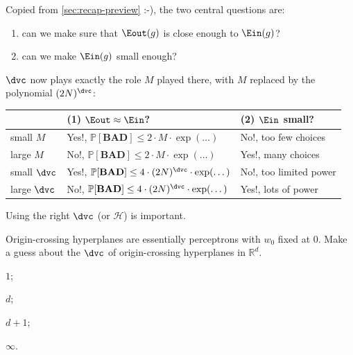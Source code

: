 Copied from \autoref{sec:recap-preview} :-), the two central questions are:

\begin{enumerate}[(1)]
    \item can we make sure that \(\Eout(g)\) is close enough to \(\Ein(g)\)?
    \item can we make \(\Ein(g)\) small enough?
\end{enumerate}

\(\dvc\) now plays exactly the role \(M\) played there, with \(M\) replaced by
the polynomial \((2N)^{\dvc}\):

\begin{center}
    \solidrules
    \begin{tabular}{@{}l|l|l@{}}
        \toprule
        & (1) \(\Eout \approx \Ein\)? & (2) \(\Ein\) small?\\
        \midrule
        small \(M\) & Yes!, \(\mathbb{P}[\textbf{BAD}] \le 2 \cdot M \cdot
        \exp(\dots)\) & No!, too few choices\\
        large \(M\) & No!, \(\mathbb{P}[\textbf{BAD}] \le 2 \cdot M \cdot
        \exp(\dots)\) & Yes!, many choices\\
        \midrule
        small \(\dvc\) & Yes!, \(\mathbb{P}[\textbf{BAD}] \le 4 \cdot
        (2N)^{\dvc} \cdot \exp(\dots)\) & No!, too limited power\\
        large \(\dvc\) & No!, \(\mathbb{P}[\textbf{BAD}] \le 4 \cdot
        (2N)^{\dvc} \cdot \exp(\dots)\) & Yes!, lots of power\\
        \bottomrule
    \end{tabular}
\end{center}

\begin{moral}
    Using the right \(\dvc\) (or \(\mathcal{H}\)) is important.
\end{moral}

\begin{exercise}
    Origin-crossing hyperplanes are essentially perceptrons with \(w_0\) fixed
    at \(0\). Make a guess about the \(\dvc\) of origin-crossing hyperplanes in
    \(\mathbb{R}^d\).
    \begin{enumerate*}[(1)]
        \item \(1\); \item \(d\); \item \(d + 1\); \item \(\infty\).
    \end{enumerate*}
\end{exercise}

